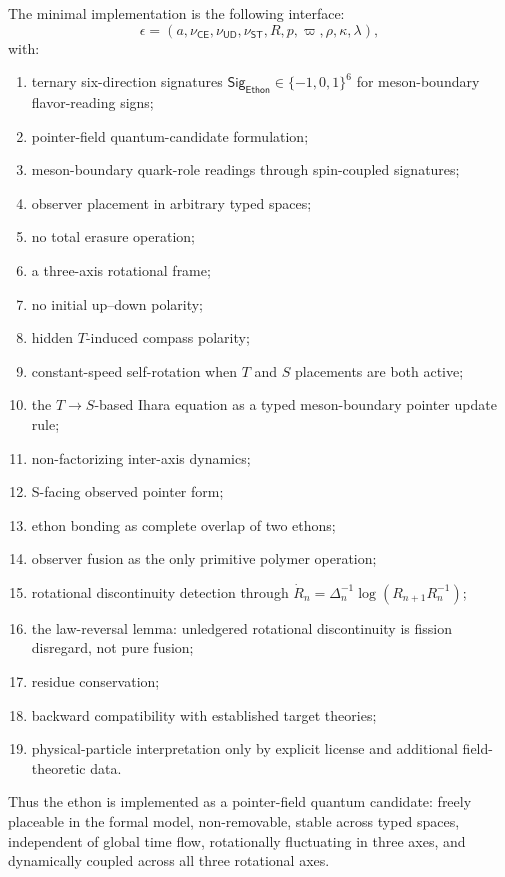 \documentclass[11pt]{article}
\theoremstyle{definition}
\theoremstyle{plain}
\newcommand{\Eth}{\mathsf{Ethon}}
\newcommand{\CE}{\mathsf{CE}}
\newcommand{\UD}{\mathsf{UD}}
\newcommand{\ST}{\mathsf{ST}}
\newcommand{\Sig}{\mathsf{Sig}}
\begin{document}
The minimal implementation is the following interface:
\[
  \epsilon
  =
  (a,\nu_{\CE},\nu_{\UD},\nu_{\ST},R,p,\varpi,\rho,\kappa,\lambda),
\]
with:
\begin{enumerate}[leftmargin=*]
  \item ternary six-direction signatures
  \(\Sig_{\Eth}\in\{-1,0,1\}^{6}\) for meson-boundary flavor-reading
  signs;
  \item pointer-field quantum-candidate formulation;
  \item meson-boundary quark-role readings through spin-coupled
  signatures;
  \item observer placement in arbitrary typed spaces;
  \item no total erasure operation;
  \item a three-axis rotational frame;
  \item no initial up--down polarity;
  \item hidden \(T\)-induced compass polarity;
  \item constant-speed self-rotation when \(T\) and \(S\) placements are
  both active;
  \item the \(T\to S\)-based Ihara equation as a typed
  meson-boundary pointer update rule;
  \item non-factorizing inter-axis dynamics;
  \item S-facing observed pointer form;
  \item ethon bonding as complete overlap of two ethons;
  \item observer fusion as the only primitive polymer operation;
  \item rotational discontinuity detection through
  \(\dot R_n=\Delta_n^{-1}\log(R_{n+1}R_n^{-1})\);
  \item the law-reversal lemma: unledgered rotational discontinuity is
  fission disregard, not pure fusion;
  \item residue conservation;
  \item backward compatibility with established target theories;
  \item physical-particle interpretation only by explicit license and
  additional field-theoretic data.
\end{enumerate}

Thus the ethon is implemented as a pointer-field quantum candidate:
freely placeable in the formal model, non-removable, stable across typed
spaces, independent of global time flow, rotationally fluctuating in
three axes, and dynamically coupled across all three rotational axes.
\end{document}
